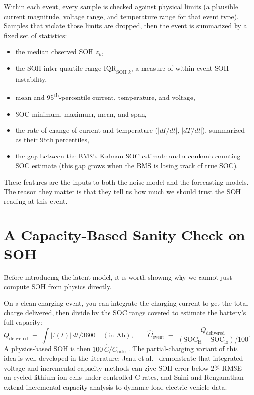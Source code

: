 \documentclass[11pt]{article}
\begin{document}
Within each event, every sample is checked against physical limits (a
plausible current magnitude, voltage range, and temperature range for
that event type). Samples that violate those limits are dropped, then the
event is summarized by a fixed set of statistics:
\begin{itemize}[leftmargin=*]
    \item the median observed SOH \(z_k\),
    \item the SOH inter-quartile range \(\mathrm{IQR}_{\mathrm{SOH},k}\),
    a measure of within-event SOH instability,
    \item mean and 95\textsuperscript{th}-percentile current,
    temperature, and voltage,
    \item SOC minimum, maximum, mean, and span,
    \item the rate-of-change of current and temperature
    (\(|dI/dt|\), \(|dT/dt|\)), summarized as their 95th percentiles,
    \item the gap between the BMS's Kalman SOC estimate and a
    coulomb-counting SOC estimate (this gap grows when the BMS is
    losing track of true SOC).
\end{itemize}
These features are the inputs to both the noise model and the
forecasting models. The reason they matter is that they tell us how
much we should trust the SOH reading at this event.

\section{A Capacity-Based Sanity Check on SOH}

Before introducing the latent model, it is worth showing why we cannot
just compute SOH from physics directly.

On a clean charging event, you can integrate the charging current to get
the total charge delivered, then divide by the SOC range covered to
estimate the battery's full capacity:
\begin{equation}
Q_{\mathrm{delivered}} \;=\; \int |I(t)|\, dt / 3600 \quad (\text{in Ah}),
\qquad
\widehat{C}_{\mathrm{event}} \;=\; \frac{Q_{\mathrm{delivered}}}{(\mathrm{SOC}_{\mathrm{hi}} - \mathrm{SOC}_{\mathrm{lo}})/100}.
\label{eq:coulomb}
\end{equation}
A physics-based SOH is then \(100\,\widehat{C}/C_{\mathrm{rated}}\). The
partial-charging variant of this idea is well-developed in the
literature: Jenu et al.~\cite{jenu2022partial} demonstrate that
integrated-voltage and incremental-capacity methods can give SOH error
below 2\% RMSE on cycled lithium-ion cells under controlled C-rates,
and Saini and Renganathan~\cite{saini2025ica} extend incremental
capacity analysis to dynamic-load electric-vehicle data.
\end{document}
